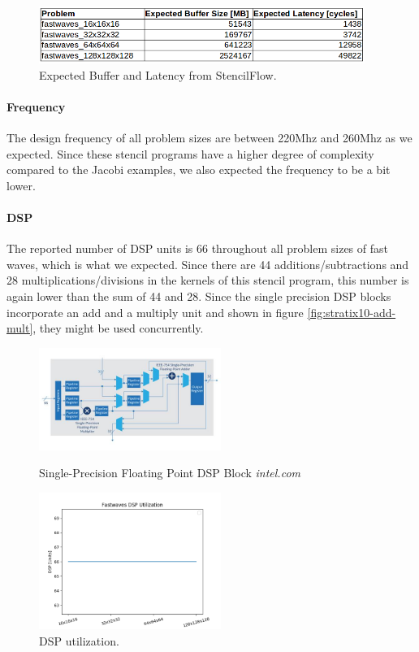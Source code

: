 \begin{figure}[h]
	\centering
	\includegraphics[height=5em]{images/fastwaves-buffer-latency.png}
	\caption{Expected Buffer and Latency from StencilFlow.}
	\label{fig:fastwaves-buffer-latency}
\end{figure}

\paragraph{Frequency}
The design frequency of all problem sizes are between 220Mhz and 260Mhz as we expected. Since these stencil programs have a higher degree of complexity compared to the Jacobi examples, we also expected the frequency to be a bit lower. 


\paragraph{DSP}
The reported number of DSP units is 66 throughout all problem sizes of fast waves, which is what we expected. Since there are 44 additions/subtractions and 28 multiplications/divisions in the kernels of this stencil program, this number is again lower than the sum of 44 and 28. Since the single precision DSP blocks incorporate an add and a multiply unit and shown in figure \ref{fig:stratix10-add-mult}, they might be used concurrently.

\begin{figure}[h]
	\begin{minipage}{.5\columnwidth}
	\centering
	\includegraphics[width=16em]{images/stratix10-add-mult.jpg}
	\caption{Single-Precision Floating Point DSP Block \textit{intel.com}}
	\label{fig:stratix10-add-mult}
	\end{minipage}
	\begin{minipage}{.5\columnwidth}
	\centering
	\includegraphics[height=12em]{plots/fastwaves_dsp.png}
	\caption{DSP utilization.}
	\label{fig:fastwaves_dsp}
	\end{minipage}
\end{figure}

